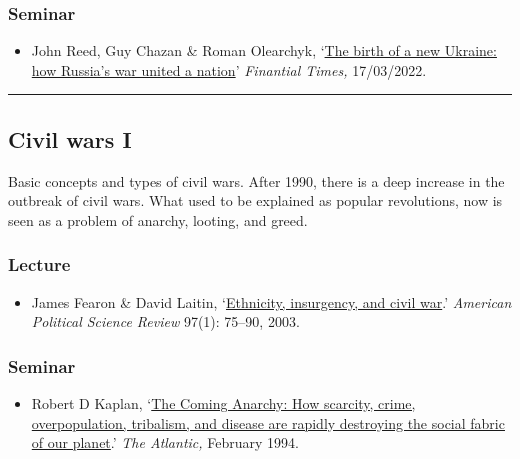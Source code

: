 \documentclass[12pt, a4paper]{article}
\begin{document}
\subsubsection*{Seminar}

\begin{itemize}
\setlength\itemsep{0pt}
\item John Reed, Guy Chazan \& Roman Olearchyk, `\href{https://www.ft.com/content/9ab50dee-67f5-4e1b-8456-d8f11814ef18}{The birth of a new Ukraine: how Russia's war united a nation}' \textit{Finantial Times,} 17/03/2022.
\end{itemize}


\hrule %

\subsection{Civil wars I}\label{cw1}

Basic concepts and types of civil wars. After 1990, there is a deep increase in the outbreak of civil wars. What used to be explained as popular revolutions, now is seen as a problem of anarchy, looting, and greed.

\subsubsection*{Lecture}

\begin{itemize}
\setlength\itemsep{0pt}
\item James Fearon \& David Laitin, `\href{https://doi.org/10.1017/S0003055403000534}{Ethnicity, insurgency, and civil war}.' \textit{American Political Science Review} 97(1): 75--90, 2003.
\end{itemize}

\subsubsection*{Seminar}

\begin{itemize}
\setlength\itemsep{-5pt}
\item Robert D Kaplan, `\href{https://www.theatlantic.com/magazine/archive/1994/02/the-coming-anarchy/304670/}{The Coming Anarchy: How scarcity, crime, overpopulation, tribalism, and disease are rapidly destroying the social fabric of our planet}.' \textit{The Atlantic,} February 1994.
\end{itemize}
\end{document}
